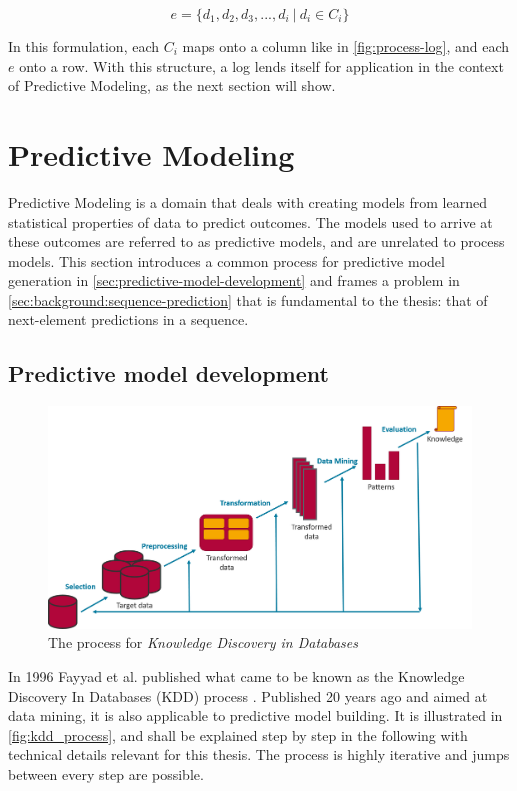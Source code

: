 $$ e = \{ d_1, d_2, d_3, ..., d_i\ |\ d_i \in C_i \}$$

In this formulation, each $C_i$ maps onto a column like in \autoref{fig:process-log}, and each $e$ onto a row. With this structure, a log lends itself for application in the context of Predictive Modeling, as the next section will show.

\section{Predictive Modeling}
\label{sec:predictive-modeling}
Predictive Modeling is a domain that deals with creating models from learned statistical properties of data to predict outcomes. The models used to arrive at these outcomes are referred to as predictive models, and are unrelated to process models. This section introduces a common process for predictive model generation in \autoref{sec:predictive-model-development} and frames a problem in \autoref{sec:background:sequence-prediction} that is fundamental to the thesis: that of next-element predictions in a sequence.

\subsection{Predictive model development}
\label{sec:predictive-model-development}
\begin{figure}
	\centering
	\includegraphics[width=\textwidth]{gfx/kdd_process.png}
	\caption{The process for \textit{Knowledge Discovery in Databases}~\cite{fayyad1996data}}
	\label{fig:kdd_process}
\end{figure}

In 1996 Fayyad et al. published what came to be known as the Knowledge Discovery In Databases (KDD) process \cite{fayyad1996data}. Published 20 years ago and aimed at data mining, it is also applicable to predictive model building. It is illustrated in \autoref{fig:kdd_process}, and shall be explained step by step in the following with technical details relevant for this thesis. The process is highly iterative and jumps between every step are possible.

